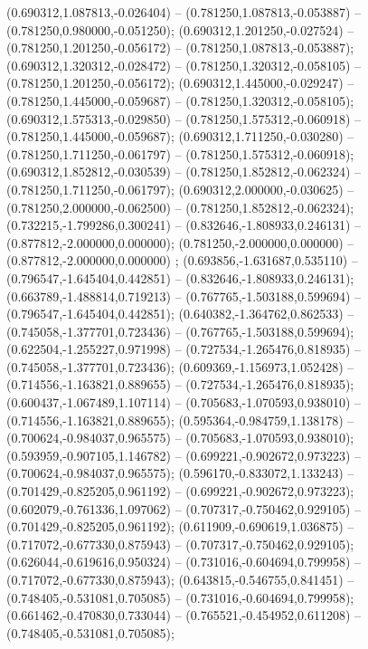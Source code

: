  (0.690312,1.087813,-0.026404) -- (0.781250,1.087813,-0.053887) -- (0.781250,0.980000,-0.051250);
 (0.690312,1.201250,-0.027524) -- (0.781250,1.201250,-0.056172) -- (0.781250,1.087813,-0.053887);
 (0.690312,1.320312,-0.028472) -- (0.781250,1.320312,-0.058105) -- (0.781250,1.201250,-0.056172);
 (0.690312,1.445000,-0.029247) -- (0.781250,1.445000,-0.059687) -- (0.781250,1.320312,-0.058105);
 (0.690312,1.575313,-0.029850) -- (0.781250,1.575312,-0.060918) -- (0.781250,1.445000,-0.059687);
 (0.690312,1.711250,-0.030280) -- (0.781250,1.711250,-0.061797) -- (0.781250,1.575312,-0.060918);
 (0.690312,1.852812,-0.030539) -- (0.781250,1.852812,-0.062324) -- (0.781250,1.711250,-0.061797);
 (0.690312,2.000000,-0.030625) -- (0.781250,2.000000,-0.062500) -- (0.781250,1.852812,-0.062324);
 (0.732215,-1.799286,0.300241) -- (0.832646,-1.808933,0.246131) -- (0.877812,-2.000000,0.000000);
 (0.781250,-2.000000,0.000000) -- (0.877812,-2.000000,0.000000) ;
 (0.693856,-1.631687,0.535110) -- (0.796547,-1.645404,0.442851) -- (0.832646,-1.808933,0.246131);
 (0.663789,-1.488814,0.719213) -- (0.767765,-1.503188,0.599694) -- (0.796547,-1.645404,0.442851);
 (0.640382,-1.364762,0.862533) -- (0.745058,-1.377701,0.723436) -- (0.767765,-1.503188,0.599694);
 (0.622504,-1.255227,0.971998) -- (0.727534,-1.265476,0.818935) -- (0.745058,-1.377701,0.723436);
 (0.609369,-1.156973,1.052428) -- (0.714556,-1.163821,0.889655) -- (0.727534,-1.265476,0.818935);
 (0.600437,-1.067489,1.107114) -- (0.705683,-1.070593,0.938010) -- (0.714556,-1.163821,0.889655);
 (0.595364,-0.984759,1.138178) -- (0.700624,-0.984037,0.965575) -- (0.705683,-1.070593,0.938010);
 (0.593959,-0.907105,1.146782) -- (0.699221,-0.902672,0.973223) -- (0.700624,-0.984037,0.965575);
 (0.596170,-0.833072,1.133243) -- (0.701429,-0.825205,0.961192) -- (0.699221,-0.902672,0.973223);
 (0.602079,-0.761336,1.097062) -- (0.707317,-0.750462,0.929105) -- (0.701429,-0.825205,0.961192);
 (0.611909,-0.690619,1.036875) -- (0.717072,-0.677330,0.875943) -- (0.707317,-0.750462,0.929105);
 (0.626044,-0.619616,0.950324) -- (0.731016,-0.604694,0.799958) -- (0.717072,-0.677330,0.875943);
 (0.643815,-0.546755,0.841451) -- (0.748405,-0.531081,0.705085) -- (0.731016,-0.604694,0.799958);
 (0.661462,-0.470830,0.733044) -- (0.765521,-0.454952,0.611208) -- (0.748405,-0.531081,0.705085);
